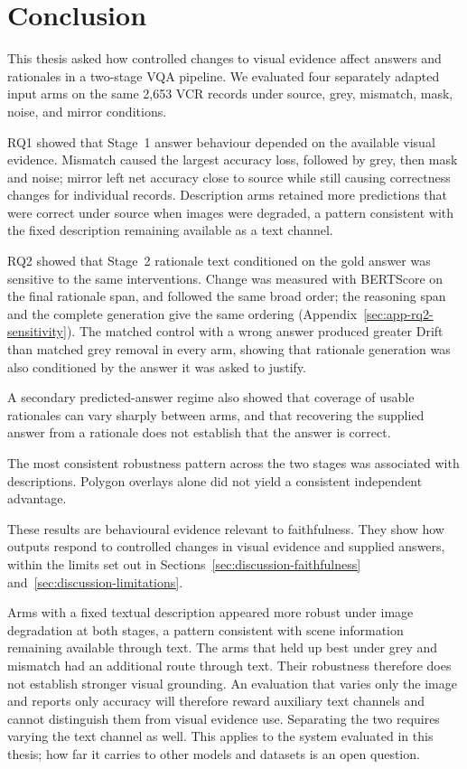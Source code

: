 
\chapter{Conclusion}
\label{ch:conclusion}

This thesis asked how controlled changes to visual evidence affect answers and
rationales in a two-stage VQA pipeline. We evaluated four separately adapted
input arms on the same 2,653 VCR records under source, grey, mismatch, mask,
noise, and mirror conditions.

RQ1 showed that Stage~1 answer behaviour depended on the available visual
evidence. Mismatch caused the largest accuracy loss, followed by grey,
then mask and noise; mirror left net accuracy close to source while still
causing correctness changes for individual records. Description arms retained
more predictions that were correct under source when images were degraded, a
pattern consistent with the fixed description remaining available as a text
channel.

RQ2 showed that Stage~2 rationale text conditioned on the gold answer was
sensitive to the same interventions. Change was measured with BERTScore on the
final rationale span, and followed the same broad order; the reasoning span and
the complete generation give the same ordering
(Appendix~\ref{sec:app-rq2-sensitivity}).
The matched control with a wrong answer produced greater Drift than
matched grey removal in every arm, showing that rationale generation was also conditioned by
the answer it was asked to justify.

A secondary predicted-answer regime also showed that coverage of usable
rationales can vary sharply between arms, and that recovering the supplied answer from a
rationale does not establish that the answer is correct.

The most consistent robustness pattern across the two stages was associated with
descriptions. Polygon overlays alone did not yield a consistent independent
advantage.

These results are behavioural evidence relevant to faithfulness. They show how
outputs respond to controlled changes in visual evidence and supplied answers,
within the limits set out in Sections~\ref{sec:discussion-faithfulness}
and~\ref{sec:discussion-limitations}.

Arms with a fixed textual description appeared more robust under image
degradation at both stages, a pattern consistent with scene information remaining
available through text. The arms that held up best under grey and mismatch had an
additional route through text. Their robustness therefore does not establish
stronger visual grounding. An evaluation that varies only the image and reports
only accuracy will therefore reward auxiliary text channels and cannot distinguish
them from visual evidence use. Separating the
two requires varying the text channel as well. This applies to the system
evaluated in this thesis; how far it carries to other models and datasets is an
open question.

